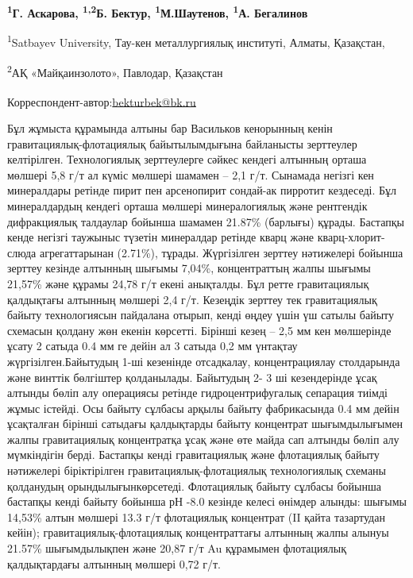 
\begin{articleheader}

{\bfseries \textsuperscript{1}Г. Аскарова, \textsuperscript{1,2}Б.
Бектур\textsuperscript{\envelope }, \textsuperscript{1}М.Шаутенов,
\textsuperscript{1}А. Бегалинов}
\end{articleheader}
\begin{affiliation}

\textsuperscript{1}Satbayev University, Тау-кен металлургиялық
институті, Алматы, Қазақстан,

\textsuperscript{2}АҚ «Майқаинзолото», Павлодар, Қазақстан

\raggedright{\bfseries \textsuperscript{\envelope }}Корреспондент-автор:\href{mailto:bekturbek@bk.run}{bekturbek@bk.ru}
\end{affiliation}

Бұл жұмыста құрамында алтыны бар Васильков кенорынның кенін
гравитациялық-флотациялық байытылымдығына байланысты зерттеулер
келтірілген. Технологиялық зерттеулерге сәйкес кендегі алтынның орташа
мөлшері 5,8 г/т ал күміс мөлшері шамамен -- 2,1 г/т. Сынамада негізгі
кен минералдары ретінде пирит пен арсенопирит сондай-ак пирротит
кездеседі. Бұл минералдардың кендегі орташа мөлшері минералогиялық және
рентгендік дифракциялық талдаулар бойынша шамамен 21.87\% (барлығы)
құрады. Бастапқы кенде негізгі таужыныс түзетін минералдар ретінде кварц
және кварц-хлорит-слюда агрегаттарынан (2.71\%), тұрады. Жүргізілген
зерттеу нәтижелері бойынша зерттеу кезінде алтынның шығымы 7,04\%,
концентраттың жалпы шығымы 21,57\% және құрамы 24,78 г/т екені
анықталды. Бұл ретте гравитациялық қалдықтағы алтынның мөлшері 2,4 г/т.
Кезеңдік зерттеу тек гравитациялық байыту технологиясын пайдалана
отырып, кенді өңдеу үшін үш сатылы байыту схемасын қолдану жөн екенін
көрсетті. Бірінші кезең -- 2,5 мм кен мөлшерінде ұсату 2 сатыда 0.4 мм
ге дейін ал 3 сатыда 0,2 мм үнтақтау жүргізілген.Байытудың 1-ші
кезенінде отсадкалау, концентрациялау столдарында және винттік бөлгіштер
қолданылады. Байытудың 2- 3 ші кезендерінде ұсақ алтынды бөліп алу
операциясы ретінде гидроцентрифугалық сепарация тиімді жұмыс істейді.
Осы байыту сұлбасы арқылы байыту фабрикасында 0.4 мм дейін ұсақталған
бірінші сатыдағы қалдықтарды байыту концентрат шығымдылығымен жалпы
гравитациялық концентратқа ұсақ және өте майда сап алтынды бөліп алу
мүмкіндігін берді. Бастапқы кенді гравитациялық және флотациялық байыту
нәтижелері біріктірілген гравитациялық-флотациялық технологиялық схеманы
қолданудың орындылығынкөрсетеді. Флотациялық байыту сұлбасы бойынша
бастапқы кенді байыту бойынша рН -8.0 кезінде келесі өнімдер алынды:
шығымы 14,53\% алтын мөлшері 13.3 г/т флотациялық концентрат (II қайта тазартудан кейін);
гравитациялық-флотациялық концентраттағы алтынның жалпы алынуы 21.57\%
шығымдылықпен және 20,87 г/т Au құрамымен флотациялық қалдықтардағы
алтынның мөлшері 0,72 г/т.

